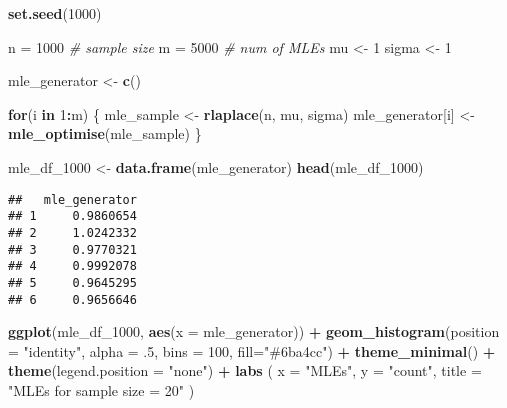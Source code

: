 \documentclass[
]{article}
\newenvironment{Shaded}{\begin{snugshade}}{\end{snugshade}}
\newcommand{\AttributeTok}[1]{\textcolor[rgb]{0.13,0.29,0.53}{#1}}
\newcommand{\CommentTok}[1]{\textcolor[rgb]{0.56,0.35,0.01}{\textit{#1}}}
\newcommand{\ControlFlowTok}[1]{\textcolor[rgb]{0.13,0.29,0.53}{\textbf{#1}}}
\newcommand{\DecValTok}[1]{\textcolor[rgb]{0.00,0.00,0.81}{#1}}
\newcommand{\FunctionTok}[1]{\textcolor[rgb]{0.13,0.29,0.53}{\textbf{#1}}}
\newcommand{\NormalTok}[1]{#1}
\newcommand{\OtherTok}[1]{\textcolor[rgb]{0.56,0.35,0.01}{#1}}
\newcommand{\SpecialCharTok}[1]{\textcolor[rgb]{0.81,0.36,0.00}{\textbf{#1}}}
\newcommand{\StringTok}[1]{\textcolor[rgb]{0.31,0.60,0.02}{#1}}
\begin{document}
\begin{Shaded}
\begin{Highlighting}[]
\FunctionTok{set.seed}\NormalTok{(}\DecValTok{1000}\NormalTok{)}

\NormalTok{n }\OtherTok{=} \DecValTok{1000} \CommentTok{\# sample size}
\NormalTok{m }\OtherTok{=} \DecValTok{5000} \CommentTok{\# num of MLEs}
\NormalTok{mu }\OtherTok{\textless{}{-}} \DecValTok{1}
\NormalTok{sigma }\OtherTok{\textless{}{-}} \DecValTok{1}

\NormalTok{mle\_generator }\OtherTok{\textless{}{-}} \FunctionTok{c}\NormalTok{()}

\ControlFlowTok{for}\NormalTok{(i }\ControlFlowTok{in} \DecValTok{1}\SpecialCharTok{:}\NormalTok{m) \{}
\NormalTok{  mle\_sample }\OtherTok{\textless{}{-}} \FunctionTok{rlaplace}\NormalTok{(n, mu, sigma)}
\NormalTok{  mle\_generator[i] }\OtherTok{\textless{}{-}} \FunctionTok{mle\_optimise}\NormalTok{(mle\_sample)}
\NormalTok{\}}

\NormalTok{mle\_df\_1000 }\OtherTok{\textless{}{-}} \FunctionTok{data.frame}\NormalTok{(mle\_generator)}
\FunctionTok{head}\NormalTok{(mle\_df\_1000)}
\end{Highlighting}
\end{Shaded}

\begin{verbatim}
##   mle_generator
## 1     0.9860654
## 2     1.0242332
## 3     0.9770321
## 4     0.9992078
## 5     0.9645295
## 6     0.9656646
\end{verbatim}

\begin{Shaded}
\begin{Highlighting}[]
\FunctionTok{ggplot}\NormalTok{(mle\_df\_1000, }\FunctionTok{aes}\NormalTok{(}\AttributeTok{x =}\NormalTok{ mle\_generator)) }\SpecialCharTok{+}
  \FunctionTok{geom\_histogram}\NormalTok{(}\AttributeTok{position =} \StringTok{"identity"}\NormalTok{, }\AttributeTok{alpha =}\NormalTok{ .}\DecValTok{5}\NormalTok{, }\AttributeTok{bins =} \DecValTok{100}\NormalTok{, }\AttributeTok{fill=}\StringTok{"\#6ba4cc"}\NormalTok{) }\SpecialCharTok{+}
  \FunctionTok{theme\_minimal}\NormalTok{() }\SpecialCharTok{+}
  \FunctionTok{theme}\NormalTok{(}\AttributeTok{legend.position =} \StringTok{"none"}\NormalTok{) }\SpecialCharTok{+}
  \FunctionTok{labs}\NormalTok{ (}
    \AttributeTok{x =} \StringTok{"MLEs"}\NormalTok{,}
    \AttributeTok{y =} \StringTok{"count"}\NormalTok{,}
    \AttributeTok{title =} \StringTok{"MLEs for sample size = 20"}
\NormalTok{  )}
\end{Highlighting}
\end{Shaded}
\end{document}
